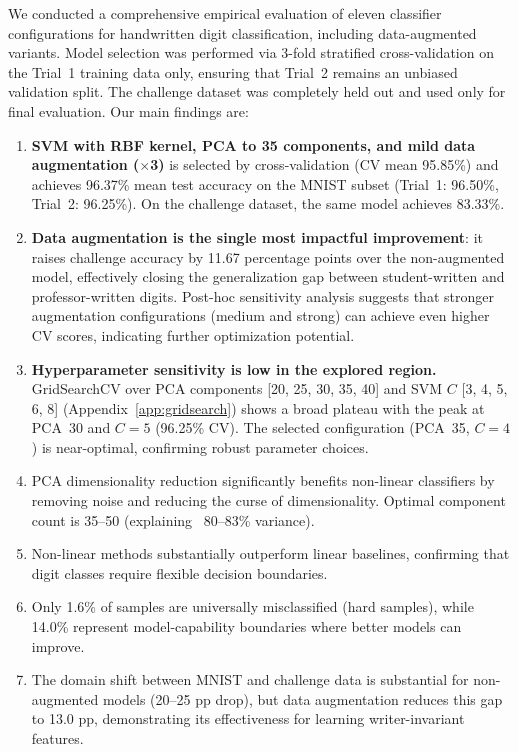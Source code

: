 \documentclass[11pt,a4paper,twocolumn]{article}
\begin{document}
We conducted a comprehensive empirical evaluation of eleven classifier configurations for handwritten digit classification, including data-augmented variants. Model selection was performed via 3-fold stratified cross-validation on the Trial~1 training data only, ensuring that Trial~2 remains an unbiased validation split. The challenge dataset was completely held out and used only for final evaluation. Our main findings are:
\begin{enumerate}
    \item \textbf{SVM with RBF kernel, PCA to 35 components, and mild data augmentation ($\times$3)} is selected by cross-validation (CV mean 95.85\%) and achieves 96.37\% mean test accuracy on the MNIST subset (Trial~1: 96.50\%, Trial~2: 96.25\%). On the challenge dataset, the same model achieves 83.33\%.
    \item \textbf{Data augmentation is the single most impactful improvement}: it raises challenge accuracy by 11.67 percentage points over the non-augmented model, effectively closing the generalization gap between student-written and professor-written digits. Post-hoc sensitivity analysis suggests that stronger augmentation configurations (medium and strong) can achieve even higher CV scores, indicating further optimization potential.
    \item \textbf{Hyperparameter sensitivity is low in the explored region.} GridSearchCV over PCA components [20, 25, 30, 35, 40] and SVM $C$ [3, 4, 5, 6, 8] (Appendix~\ref{app:gridsearch}) shows a broad plateau with the peak at PCA~30 and $C=5$ (96.25\% CV). The selected configuration (PCA~35, $C=4$) is near-optimal, confirming robust parameter choices.
    \item PCA dimensionality reduction significantly benefits non-linear classifiers by removing noise and reducing the curse of dimensionality. Optimal component count is 35--50 (explaining ~80--83\% variance).
    \item Non-linear methods substantially outperform linear baselines, confirming that digit classes require flexible decision boundaries.
    \item Only 1.6\% of samples are universally misclassified (hard samples), while 14.0\% represent model-capability boundaries where better models can improve.
    \item The domain shift between MNIST and challenge data is substantial for non-augmented models (20--25 pp drop), but data augmentation reduces this gap to 13.0 pp, demonstrating its effectiveness for learning writer-invariant features.
\end{enumerate}
\end{document}
